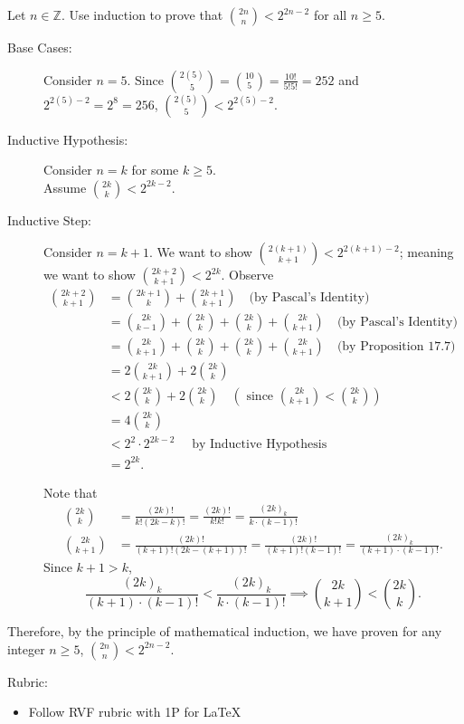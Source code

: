 \documentclass{article}
\newcommand{\Z}{\mathbb{Z}}
\theoremstyle{definition}
\begin{document}
\begin{question}{10}
    Let $n\in \Z$. Use induction to prove that $\binom{2n}{n} < 2^{2n-2}$ for all $n\geq 5$. 
\end{question}
\begin{solution}
	\begin{description}
	\item[Base Cases: ] Consider $n=5$. Since $\binom{2(5)}{5}=\binom{10}{5} = \frac{10!}{5!5!} = 252$ and $2^{2(5)-2}= 2^8 = 256$, $\binom{2(5)}{5}<2^{2(5)-2}$.
	
	\item[Inductive Hypothesis: ] Consider $n=k$ for some $k\geq 5$.\\ Assume $\binom{2k}{k} < 2^{2k-2}$.
	
	\item[Inductive Step: ] Consider $n=k+1$. We want to show $\binom{2(k+1)}{k+1} < 2^{2(k+1)-2}$; meaning we want to show $\binom{2k+2}{k+1} < 2^{2k}$. Observe
 \begin{align*}
     \binom{2k+2}{k+1} &= \binom{2k+1}{k} + \binom{2k+1}{k+1} \quad \text{(by Pascal's Identity)}\\
     &= \binom{2k}{k-1} + \binom{2k}{k}  + \binom{2k}{k} + \binom{2k}{k+1} \quad \text{(by Pascal's Identity)}\\
     &= \binom{2k}{k+1} + \binom{2k}{k}  + \binom{2k}{k} + \binom{2k}{k+1} \quad \text{(by Proposition 17.7)}\\
     &= 2\binom{2k}{k+1} + 2\binom{2k}{k}\\
     & <2\binom{2k}{k} + 2\binom{2k}{k} \quad \left(\text{ since } \binom{2k}{k+1}< \binom{2k}{k}\right)\\ 
     &= 4\binom{2k}{k}\\
     & < 2^2 \cdot 2^{2k-2} \quad \text{ by Inductive Hypothesis}\\
     & = 2^{2k}.
 \end{align*}

Note that 
\begin{align*}
\binom{2k}{k} &= \frac{(2k)!}{k!(2k-k)!} = \frac{(2k)!}{k!k!} = \frac{(2k)_k}{k\cdot (k-1)!}\\
\binom{2k}{k+1} &= \frac{(2k)!}{(k+1)!(2k-(k+1))!} = \frac{(2k)!}{(k+1)!(k-1)!} = \frac{(2k)_k}{(k+1)\cdot (k-1)!}.
\end{align*}
Since $k+1 >k$, 
\[
\frac{(2k)_k}{(k+1)\cdot (k-1)!} < \frac{(2k)_k}{k\cdot (k-1)!} \implies \binom{2k}{k+1}< \binom{2k}{k}.
\]
	\end{description}
	Therefore, by the principle of mathematical induction, we have proven for any integer $n\geq 5$, $\binom{2n}{n} < 2^{2n-2}$.
	
{\color{red} Rubric:
\begin{itemize}
\item Follow RVF rubric with 1P for \LaTeX
\end{itemize}}
\end{solution}
\end{document}
